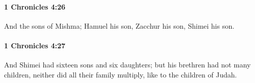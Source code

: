 		\paragraph{1 Chronicles 4:26} %
			\label{1CHRONICLES-4-26}

			And the sons of Mishma; Hamuel his son, Zacchur his son, Shimei his son.


		\paragraph{1 Chronicles 4:27} %
			\label{1CHRONICLES-4-27}

			And Shimei had sixteen sons and six daughters; but his brethren had not many children, neither did all their family multiply, like to the children of Judah.


